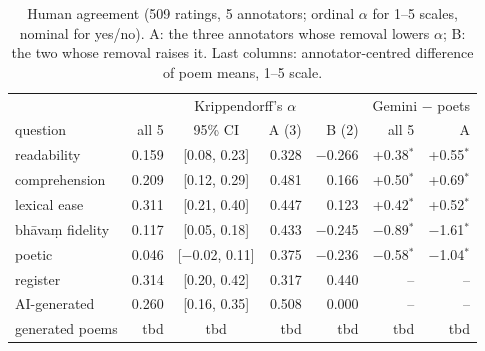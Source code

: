 \documentclass[11pt]{article}
\newcommand{\tbd}{\textcolor{pend}{\textsf{tbd}}}
\newcommand{\sig}{$^{\ast}$}
\begin{document}
\begin{table}[t]
\centering\scriptsize\setlength{\tabcolsep}{2.3pt}
\begin{tabular}{@{}lrcrrrr@{}}
\toprule
 & \multicolumn{4}{c}{Krippendorff's $\alpha$} & \multicolumn{2}{c}{Gemini $-$ poets} \\
question & all 5 & 95\% CI & A (3) & B (2) & all 5 & A \\
\midrule
readability & 0.159 & [0.08, 0.23] & 0.328 & $-$0.266 & +0.38\sig & +0.55\sig \\
comprehension & 0.209 & [0.12, 0.29] & 0.481 & 0.166 & +0.50\sig & +0.69\sig \\
lexical ease & 0.311 & [0.21, 0.40] & 0.447 & 0.123 & +0.42\sig & +0.52\sig \\
bhāvaṃ fidelity & 0.117 & [0.05, 0.18] & 0.433 & $-$0.245 & $-$0.89\sig & $-$1.61\sig \\
poetic & 0.046 & [$-$0.02, 0.11] & 0.375 & $-$0.236 & $-$0.58\sig & $-$1.04\sig \\
register & 0.314 & [0.20, 0.42] & 0.317 & 0.440 & -- & -- \\
AI-generated & 0.260 & [0.16, 0.35] & 0.508 & 0.000 & -- & -- \\
\midrule
generated poems & \tbd & \tbd & \tbd & \tbd & \tbd & \tbd \\
\bottomrule
\end{tabular}
\caption{Human agreement (509 ratings, 5 annotators; ordinal $\alpha$ for 1--5 scales, nominal for yes/no). A:
the three annotators whose removal lowers $\alpha$; B: the two whose removal raises it. Last columns:
annotator-centred difference of poem means, 1--5 scale.}
\label{tab:human}
\end{table}
\end{document}
